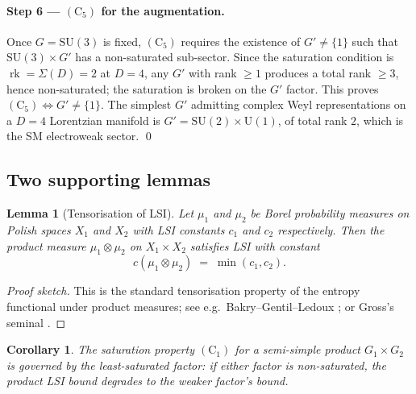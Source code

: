 \documentclass[11pt,reqno]{amsart}
\theoremstyle{plain}
\newtheorem{lemma}[theorem]{Lemma}
\newtheorem{corollary}[theorem]{Corollary}
\theoremstyle{definition}
\theoremstyle{remark}
\newcommand{\rk}{\operatorname{rk}}
\newcommand{\SU}{\mathrm{SU}}
\newcommand{\Cone}{(\mathrm{C}_1)}
\newcommand{\Cfive}{(\mathrm{C}_5)}
\begin{document}
\paragraph{Step 6 --- $\Cfive$ for the augmentation.}
Once $G = \SU(3)$ is fixed, $\Cfive$ requires the existence of $G' \ne \{1\}$ such that $\SU(3) \times G'$ has a non-saturated sub-sector. Since the saturation condition is $\rk = \Sigma(D) = 2$ at $D = 4$, any $G'$ with rank $\ge 1$ produces a total rank $\ge 3$, hence non-saturated; the saturation is broken on the $G'$ factor. This proves $\Cfive \Leftrightarrow G' \ne \{1\}$. The simplest $G'$ admitting complex Weyl representations on a $D = 4$ Lorentzian manifold is $G' = \SU(2) \times \mathrm{U}(1)$, of total rank $2$, which is the SM electroweak sector. \qed

\subsection{Two supporting lemmas}\label{ssec:lemmas}

\begin{lemma}[Tensorisation of LSI]\label{lem:tensorisation}
Let $\mu_1$ and $\mu_2$ be Borel probability measures on Polish spaces $X_1$ and $X_2$ with LSI constants $c_1$ and $c_2$ respectively. Then the product measure $\mu_1 \otimes \mu_2$ on $X_1 \times X_2$ satisfies LSI with constant
\[
  c(\mu_1 \otimes \mu_2) \;=\; \min(c_1, c_2).
\]
\end{lemma}

\begin{proof}[Proof sketch]
This is the standard tensorisation property of the entropy functional under product measures; see e.g.\ Bakry--Gentil--Ledoux \cite[Proposition 5.2.7]{BGL14}; or Gross's seminal \cite{Gross1975}.
\end{proof}

\begin{corollary}
The saturation property $\Cone$ for a semi-simple product $G_1 \times G_2$ is governed by the \emph{least-saturated} factor: if either factor is non-saturated, the product LSI bound degrades to the weaker factor's bound.
\end{corollary}
\end{document}
